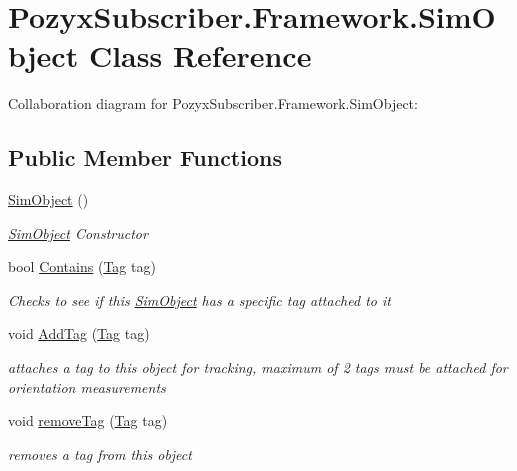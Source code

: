 \hypertarget{class_pozyx_subscriber_1_1_framework_1_1_sim_object}{}\section{Pozyx\+Subscriber.\+Framework.\+Sim\+Object Class Reference}
\label{class_pozyx_subscriber_1_1_framework_1_1_sim_object}


Collaboration diagram for Pozyx\+Subscriber.\+Framework.\+Sim\+Object\+:
\subsection*{Public Member Functions}
\begin{DoxyCompactItemize}
\item 
\hyperlink{class_pozyx_subscriber_1_1_framework_1_1_sim_object_ab0a3cd312e9fdd62beea5f4dd5ecbd7f}{Sim\+Object} ()
\begin{DoxyCompactList}\small\item\em \hyperlink{class_pozyx_subscriber_1_1_framework_1_1_sim_object}{Sim\+Object} Constructor \end{DoxyCompactList}\item 
bool \hyperlink{class_pozyx_subscriber_1_1_framework_1_1_sim_object_a54c41e58e89d8ed0c99f4438decbeb2c}{Contains} (\hyperlink{class_pozyx_subscriber_1_1_framework_1_1_tag}{Tag} tag)
\begin{DoxyCompactList}\small\item\em Checks to see if this \hyperlink{class_pozyx_subscriber_1_1_framework_1_1_sim_object}{Sim\+Object} has a specific tag attached to it \end{DoxyCompactList}\item 
void \hyperlink{class_pozyx_subscriber_1_1_framework_1_1_sim_object_a9cac7e5ea0f5e6e5d0018a62ae055de0}{Add\+Tag} (\hyperlink{class_pozyx_subscriber_1_1_framework_1_1_tag}{Tag} tag)
\begin{DoxyCompactList}\small\item\em attaches a tag to this object for tracking, maximum of 2 tags must be attached for orientation measurements \end{DoxyCompactList}\item 
void \hyperlink{class_pozyx_subscriber_1_1_framework_1_1_sim_object_a4b3f38bbd3d9ad1b621f08c2317d66f8}{remove\+Tag} (\hyperlink{class_pozyx_subscriber_1_1_framework_1_1_tag}{Tag} tag)
\begin{DoxyCompactList}\small\item\em removes a tag from this object \end{DoxyCompactList}\item 

\end{DoxyCompactItemize}
